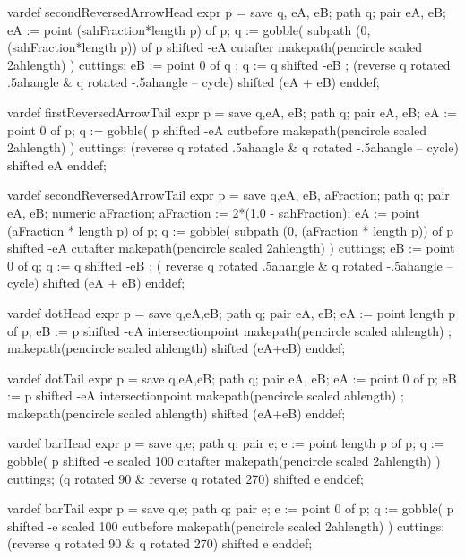   vardef secondReversedArrowHead expr p =
    save q, eA, eB; path q; pair eA, eB;
    eA := point (sahFraction*length p) of p;
    q := gobble(
      subpath (0, (sahFraction*length p)) of p shifted -eA 
      cutafter makepath(pencircle scaled 2ahlength)
    ) cuttings;
    eB := point 0 of q ;
    q := q shifted -eB ;
    (reverse q rotated .5ahangle & q rotated -.5ahangle -- cycle)
      shifted (eA + eB)
  enddef;

  vardef firstReversedArrowTail expr p =
    save q,eA, eB; path q; pair eA, eB;
    eA := point 0 of p;
    q := gobble(
      p shifted -eA
      cutbefore makepath(pencircle scaled 2ahlength)
    ) cuttings;
    (reverse q rotated .5ahangle & q rotated -.5ahangle -- cycle)
      shifted eA
  enddef;
  
  vardef secondReversedArrowTail expr p =
    save q,eA, eB, aFraction; path q; pair eA, eB; numeric aFraction;
    aFraction := 2*(1.0 - sahFraction);
    eA := point (aFraction * length p) of p;
    q := gobble(
      subpath (0, (aFraction * length p)) of p shifted -eA
      cutafter makepath(pencircle scaled 2ahlength)
    ) cuttings;
    eB := point 0 of q;
    q := q shifted -eB ;
    ( reverse q rotated .5ahangle & q rotated -.5ahangle -- cycle)
      shifted (eA + eB)
  enddef;
  
  
  vardef dotHead expr p =
    save q,eA,eB; path q; pair eA, eB;
    eA := point length p of p;
    eB := p shifted -eA intersectionpoint makepath(pencircle scaled ahlength) ;
    makepath(pencircle scaled ahlength) shifted (eA+eB)
  enddef;
  
  vardef dotTail expr p =
    save q,eA,eB; path q; pair eA, eB;
    eA := point 0 of p;
    eB := p shifted -eA intersectionpoint makepath(pencircle scaled ahlength) ;
    makepath(pencircle scaled ahlength) shifted (eA+eB)
  enddef;

  
  vardef barHead expr p =
    save q,e; path q; pair e;
    e := point length p of p;
    q := gobble(
      p shifted -e scaled 100
      cutafter makepath(pencircle scaled 2ahlength)
    ) cuttings;
    (q rotated 90 & reverse q rotated 270) shifted e
  enddef;

  vardef barTail expr p =
    save q,e; path q; pair e;
    e := point 0 of p;
    q := gobble(
      p shifted -e scaled 100
      cutbefore makepath(pencircle scaled 2ahlength)
    ) cuttings;
    (reverse q rotated 90 & q rotated 270) shifted e
  enddef;
  
